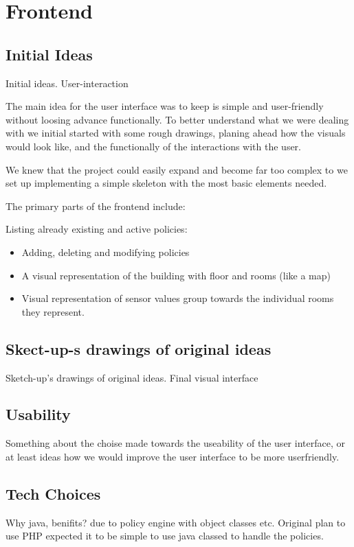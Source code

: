 \section{Frontend}
\subsection{Initial Ideas}
Initial ideas. User-interaction

The main idea for the user interface was to keep is simple and user-friendly without loosing advance functionally\cite{Krug:2005:DMM:1051204}. To better understand what we were dealing with we initial started with some rough drawings, planing ahead how the visuals would look like, and the functionally of the interactions with the user.

We knew that the project could easily expand and become far too complex to we set up implementing a simple skeleton with the most basic elements needed.

The primary parts of the frontend include:

Listing already existing and active policies:
\begin{itemize}
\item Adding, deleting and modifying policies
\item A visual representation of the building with floor and rooms (like a map)
\item Visual representation of sensor values group towards the individual rooms they represent.
\end{itemize}



\subsection{Skect-up-s drawings of original ideas}

	Sketch-up's drawings of original ideas.
	Final visual interface
	

\subsection{Usability}
Something about the choise made towards the useability of the user interface, or at least ideas how we would improve the user interface to be more userfriendly.


\subsection{Tech Choices}
Why java, benifits? due to policy engine with object classes etc. Original plan to use PHP expected it to be simple to use java classed to handle the policies.
